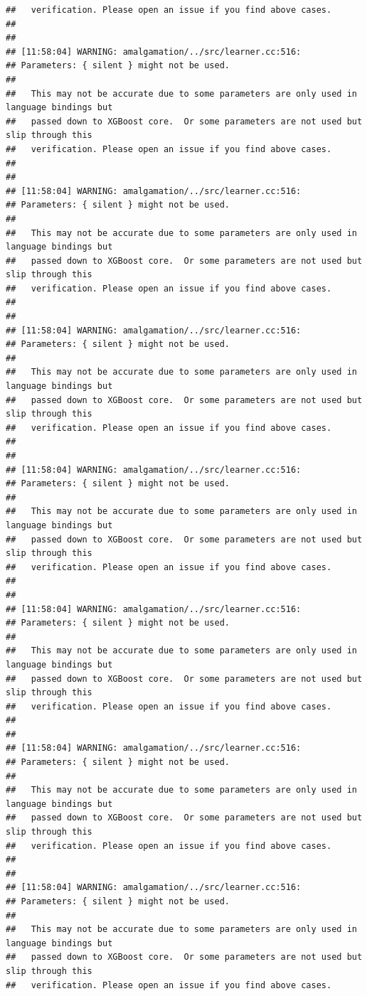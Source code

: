 \documentclass[AMS,STIX2COL]{WileyNJD-v2}\usepackage[]{graphicx}\usepackage[]{color}
\makeatletter
\newenvironment{kframe}{%
 \def\at@end@of@kframe{}%
 \ifinner\ifhmode%
  \def\at@end@of@kframe{\end{minipage}}%
  \begin{minipage}{\columnwidth}%
 \fi\fi%
 \def\FrameCommand##1{\hskip\@totalleftmargin \hskip-\fboxsep
 \colorbox{shadecolor}{##1}\hskip-\fboxsep
     \hskip-\linewidth \hskip-\@totalleftmargin \hskip\columnwidth}%
 \MakeFramed {\advance\hsize-\width
   \@totalleftmargin\z@ \linewidth\hsize
   \@setminipage}}%
 {\par\unskip\endMakeFramed%
 \at@end@of@kframe}
\newenvironment{knitrout}{}{} %
\makeatother
\begin{document}
\begin{knitrout}
\begin{kframe}
\begin{verbatim}
##   verification. Please open an issue if you find above cases.
## 
## 
## [11:58:04] WARNING: amalgamation/../src/learner.cc:516: 
## Parameters: { silent } might not be used.
## 
##   This may not be accurate due to some parameters are only used in language bindings but
##   passed down to XGBoost core.  Or some parameters are not used but slip through this
##   verification. Please open an issue if you find above cases.
## 
## 
## [11:58:04] WARNING: amalgamation/../src/learner.cc:516: 
## Parameters: { silent } might not be used.
## 
##   This may not be accurate due to some parameters are only used in language bindings but
##   passed down to XGBoost core.  Or some parameters are not used but slip through this
##   verification. Please open an issue if you find above cases.
## 
## 
## [11:58:04] WARNING: amalgamation/../src/learner.cc:516: 
## Parameters: { silent } might not be used.
## 
##   This may not be accurate due to some parameters are only used in language bindings but
##   passed down to XGBoost core.  Or some parameters are not used but slip through this
##   verification. Please open an issue if you find above cases.
## 
## 
## [11:58:04] WARNING: amalgamation/../src/learner.cc:516: 
## Parameters: { silent } might not be used.
## 
##   This may not be accurate due to some parameters are only used in language bindings but
##   passed down to XGBoost core.  Or some parameters are not used but slip through this
##   verification. Please open an issue if you find above cases.
## 
## 
## [11:58:04] WARNING: amalgamation/../src/learner.cc:516: 
## Parameters: { silent } might not be used.
## 
##   This may not be accurate due to some parameters are only used in language bindings but
##   passed down to XGBoost core.  Or some parameters are not used but slip through this
##   verification. Please open an issue if you find above cases.
## 
## 
## [11:58:04] WARNING: amalgamation/../src/learner.cc:516: 
## Parameters: { silent } might not be used.
## 
##   This may not be accurate due to some parameters are only used in language bindings but
##   passed down to XGBoost core.  Or some parameters are not used but slip through this
##   verification. Please open an issue if you find above cases.
## 
## 
## [11:58:04] WARNING: amalgamation/../src/learner.cc:516: 
## Parameters: { silent } might not be used.
## 
##   This may not be accurate due to some parameters are only used in language bindings but
##   passed down to XGBoost core.  Or some parameters are not used but slip through this
##   verification. Please open an issue if you find above cases.

\end{verbatim}
\end{kframe}
\end{knitrout}
\end{document}

